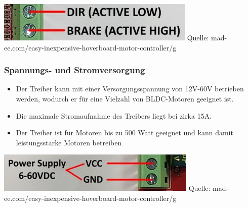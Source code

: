 \documentclass[ngerman,12pt,a4paper]{article}
\begin{document}
		\begin{center}
			\begin{minipage}{\textwidth}
				\centering
				\includegraphics[scale=1]{Pictures/Bremse-Richtungswechsel}
				\label{fig:spiffs_init}
				\vspace{-2pt}
				\small Quelle: mad-ee.com/easy-inexpensive-hoverboard-motor-controller/g
			\end{minipage}
		\end{center}
		
		\subsubsection*{Spannungs- und Stromversorgung}
		\begin{itemize}
			\item Der Treiber kann mit einer Versorgungsspannung von 12V-60V betrieben werden, wodurch er für eine Vielzahl von BLDC-Motoren geeignet ist.
			\item Die maximale Stromaufnahme des Treibers liegt bei zirka 15A.
			\item Der Treiber ist für Motoren bis zu 500 Watt geeignet und kann damit leistungsstarke Motoren betreiben
		\end{itemize}
		
		\begin{center}
			\begin{minipage}{\textwidth}
				\centering
				\includegraphics[scale=1]{Pictures/Versorgung}
				\label{fig:spiffs_init}
				\vspace{-2pt}
				\small Quelle: mad-ee.com/easy-inexpensive-hoverboard-motor-controller/g
			\end{minipage}
		\end{center}
		
		\newpage
		
\end{document}
